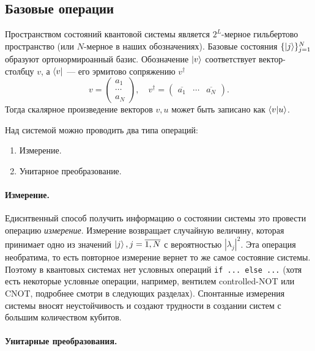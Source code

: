 \documentclass{article}
\theoremstyle{definition}
\begin{document}
\subsection{Базовые операции}

Пространством состояний квантовой системы является $2^L$-мерное гильбертово пространство
(или $N$-мерное в наших обозначениях).
Базовые состояния $\{\ket{j}\}_{j=1}^N$ образуют ортонормироанный базис.
Обозначение $\ket{v}$ соответствует вектор-столбцу $v$, а $\bra{v}$ --- его эрмитово сопряжению $v^\dag$
\[
    v = \begin{pmatrix}
    a_1 \\
    \cdots \\
    a_N 
    \end{pmatrix},
    \quad
    v^\dag = \begin{pmatrix} \overline{a_1} & \cdots & \overline{a_N} \end{pmatrix}.
\]
Тогда скалярное произведение векторов $v, u$ может быть записано как $\bra{v}\ket{u}$.

Над системой можно проводить два типа операций:
\begin{enumerate}
    \item Измерение.
    \item Унитарное преобразование.
\end{enumerate}

\paragraph*{Измерение.}
Едиснтвенный способ получить информацию о состоянии системы это провести операцию {\em измерение}.
Измерение возвращает случайную величину, которая принимает одно из значений $\ket{j}, j=\overline{1, N}$
с вероятностью $|\lambda_j|^2$.
Эта операция необратима, то есть повторное измерение вернет то же самое состояние системы.
Поэтому в квантовых системах нет условных операций \texttt{if ... else ...} (хотя есть некоторые условные операции, например, вентилем controlled-NOT или CNOT, подробнее смотри в следующих разделах).
Спонтанные измерения системы вносят неустойчивость и создают трудности в создании систем с большим количеством кубитов.

\paragraph*{Унитарные преобразования.}
\end{document}
